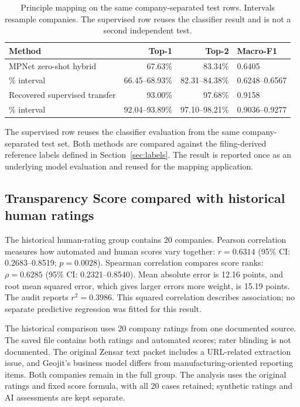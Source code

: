 \begin{table}[tbp]
\centering\small
\caption{Principle mapping on the same company-separated test rows. Intervals resample companies. The supervised row reuses the classifier result and is not a second independent test.}
\label{tab:mapping}
\begin{tabularx}{\linewidth}{@{}Yrrl@{}}
\toprule\textbf{Method} & \textbf{Top-1} & \textbf{Top-2} & \textbf{Macro-F1}\\\midrule
MPNet zero-shot hybrid & 67.63\% & 83.34\% & 0.6405\\
\% interval & 66.45--68.93\% & 82.31--84.38\% & 0.6248--0.6567\\
Recovered supervised transfer & 93.00\% & 97.68\% & 0.9158\\
\% interval & 92.04--93.89\% & 97.10--98.21\% & 0.9036--0.9277\\\bottomrule
\end{tabularx}
\end{table}

The supervised row reuses the classifier evaluation from the same company-separated test set. Both methods are compared against the filing-derived reference labels defined in Section~\ref{sec:labels}. The result is reported once as an underlying model evaluation and reused for the mapping application.

\subsection{Transparency Score compared with historical human ratings}

The historical human-rating group contains 20 companies. Pearson correlation measures how automated and human scores vary together: $r=0.6314$ (95\% CI: 0.2683--0.8519; $p=0.0028$). Spearman correlation compares score ranks: $\rho=0.6285$ (95\% CI: 0.2321--0.8540). Mean absolute error is 12.16 points, and root mean squared error, which gives larger errors more weight, is 15.19 points. The audit reports $r^2=0.3986$. This squared correlation describes association; no separate predictive regression was fitted for this result.

The historical comparison uses 20 company ratings from one documented source. The saved file contains both ratings and automated scores; rater blinding is not documented. The original Zensar text packet includes a URL-related extraction issue, and Geojit's business model differs from manufacturing-oriented reporting items. Both companies remain in the full group. The analysis uses the original ratings and fixed score formula, with all 20 cases retained; synthetic ratings and AI assessments are kept separate.

